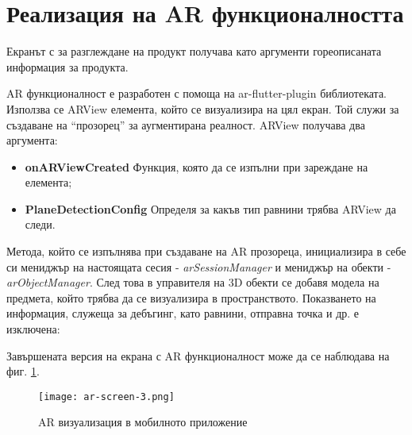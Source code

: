 \section{Реализация на AR функционалността}
Екранът с за разглеждане на продукт получава като аргументи гореописаната информация за продукта.



AR функционалност е разработен с помоща на ar-flutter-plugin библиотеката. Използва се ARView елемента, който се визуализира на цял екран. Той служи за създаване на ``прозорец'' за аугментирана реалност. ARView получава два аргумента:

\begin{itemize}
    \item \textbf{onARViewCreated}
    Функция, която да се изпълни при зареждане на елемента;
    \item \textbf{PlaneDetectionConfig}
    Определя за какъв тип равнини трябва ARView да следи.
\end{itemize}



Метода, който се изпълнява при създаване на AR прозореца, инициализира в себе си мениджър на настоящата сесия - \emph{arSessionManager} и мениджър на обекти - \emph{arObjectManager}. След това в управителя на 3D обекти се добавя модела на предмета, който трябва да се визуализира в пространството. Показването на информация, служеща за дебъгинг, като равнини, отправна точка и др. е изключена:



Завършената версия на екрана с AR функционалност може да се наблюдава на фиг. \ref{fig:ar-screen-in-3}.

\begin{figure}[H]
    \texttt{[image: ar-screen-3.png]}
    \centering
    \caption{AR визуализация в мобилното приложение}
    \label{fig:ar-screen-in-3}
\end{figure}